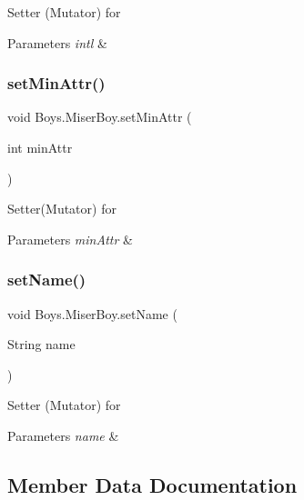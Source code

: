 Setter (Mutator) for 
\begin{DoxyParams}{Parameters}
{\em intl} & \\
\hline
\end{DoxyParams}
\mbox{\label{class_boys_1_1_miser_boy_add81a2fadf242cec77df244df2e3b06c}} 
\subsubsection{\texorpdfstring{set\+Min\+Attr()}{setMinAttr()}}
{\footnotesize\ttfamily void Boys.\+Miser\+Boy.\+set\+Min\+Attr (\begin{DoxyParamCaption}\item[{int}]{min\+Attr }\end{DoxyParamCaption})\hspace{0.3cm}{\ttfamily [inline]}}

Setter(\+Mutator) for 
\begin{DoxyParams}{Parameters}
{\em min\+Attr} & \\
\hline
\end{DoxyParams}
\mbox{\label{class_boys_1_1_miser_boy_a0d5483f6d82fa631f83474284cedec15}} 
\subsubsection{\texorpdfstring{set\+Name()}{setName()}}
{\footnotesize\ttfamily void Boys.\+Miser\+Boy.\+set\+Name (\begin{DoxyParamCaption}\item[{String}]{name }\end{DoxyParamCaption})\hspace{0.3cm}{\ttfamily [inline]}}

Setter (Mutator) for 
\begin{DoxyParams}{Parameters}
{\em name} & \\
\hline
\end{DoxyParams}


\subsection{Member Data Documentation}
\mbox{\label{class_boys_1_1_miser_boy_aa5bf26722d983a7d36c805e2d117ac7d}} 
